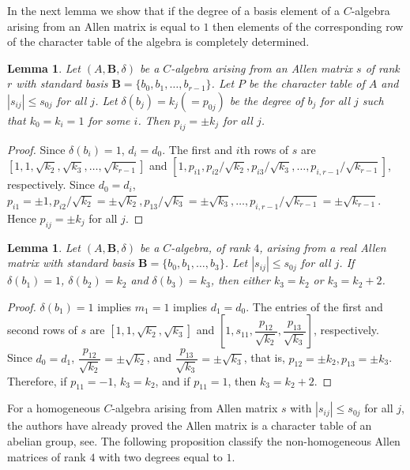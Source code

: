 \documentclass[12pt]{amsart}
\newtheorem{lemma}[thm]{Lemma}
\begin{document}
\smallskip

In the next lemma we show that if the degree of a basis element of a $C$-algebra arising from an Allen matrix is equal to $1$ then elements of the corresponding row of the character table of the algebra is completely determined.

\begin{lemma}\label{EqualityOfKandLLemmaRank5}Let $(A,{{\mathbf B}}, \delta)$ be a $C$-algebra arising from an Allen matrix $s$ of rank $r$ with standard  basis ${{\mathbf B}}=\{b_0,b_1,\hdots, b_{r-1}\}$. Let $P$ be the character table of $A$ and  $|s_{ij}|\leq s_{0j}$ for all $j$. Let $\delta(b_j)=k_j(=p_{0j})$ be the degree of $b_j$ for all $j$ such that $k_0=k_i=1$ for some $i$. Then $p_{ij}=\pm k_j$ for all $j$.
\end{lemma}

\begin{proof}
Since $\delta(b_i)=1$,  $d_i= d_0$. The first and $i$th rows of $s$ are $[1,1,\sqrt{k_2},\sqrt{k_3},\hdots, \sqrt{k_{r-1}}]$ and $[1,p_{i1},p_{i2}/\sqrt{k_2},p_{i3}/\sqrt{k_3},\hdots, p_{i,r-1}/\sqrt{k_{r-1}}]$, respectively. Since $d_0=d_i$,
$p_{i1}=\pm 1, p_{i2}/\sqrt{k_2}=\pm \sqrt{k_2}, p_{13}/\sqrt{k_3}=\pm \sqrt{k_3}, \hdots, p_{i,r-1}/\sqrt{k_{r-1}}=\pm \sqrt{k_{r-1}}$. Hence $p_{ij}=\pm k_j$ for all $j$.
\end{proof}

\begin{lemma}\label{EqualityOfKandLLemmaRank4}Let $(A,{{\mathbf B}}, \delta)$ be a $C$-algebra, of rank $4$, arising from a real Allen matrix with standard  basis ${{\mathbf B}}=\{b_0,b_1,\hdots, b_3\}$. Let $|s_{ij}|\leq s_{0j}$ for all $j$. If $\delta(b_1)=1$, $\delta(b_2)=k_2$ and $\delta(b_3) =k_3$, then either $k_3=k_2$ or $k_3=k_2+2$.
\end{lemma}

\begin{proof}
$\delta(b_1)=1$ implies $m_1 =1$ implies $d_1= d_0$. The entries of the first and second rows of $s$ are $[1,1,\sqrt{k_2},\sqrt{k_3}]$ and $[1, s_{11}, \dfrac{p_{12}}{\sqrt{k_2}},\dfrac{p_{13}}{\sqrt{k_3}}]$, respectively. Since $d_0=d_1$,
$\dfrac{p_{12}}{\sqrt{k_2}}=\pm \sqrt{k_2}$,  and $\dfrac{p_{13}}{\sqrt{k_3}}=\pm\sqrt{k_3}$, that is, $p_{12} = \pm k_2, p_{13}=\pm k_3$. Therefore, if $p_{11} = -1$, $k_3=k_2$, and if $p_{11} = 1$, then $k_3=k_2+2$.
\end{proof}

For a homogeneous $C$-algebra arising from Allen matrix $s$ with $|s_{ij}|\leq s_{0j} $ for all $j$, the authors have already proved the Allen matrix is a character table of an abelian group, see. The following proposition classify the non-homogeneous Allen matrices of rank $4$ with two degrees equal to $1$.
\end{document}
